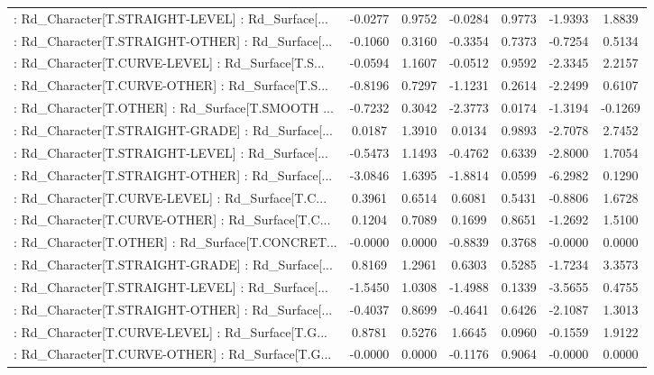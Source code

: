 \begin{longtable}{p{4cm}cccccc}
 : Rd\_Character[T.STRAIGHT-LEVEL] : Rd\_Surface[... & -0.0277 &    0.9752 & -0.0284 &       0.9773 & -1.9393 &  1.8839 \\
 : Rd\_Character[T.STRAIGHT-OTHER] : Rd\_Surface[... & -0.1060 &    0.3160 & -0.3354 &       0.7373 & -0.7254 &  0.5134 \\
 : Rd\_Character[T.CURVE-LEVEL] : Rd\_Surface[T.S... & -0.0594 &    1.1607 & -0.0512 &       0.9592 & -2.3345 &  2.2157 \\
 : Rd\_Character[T.CURVE-OTHER] : Rd\_Surface[T.S... & -0.8196 &    0.7297 & -1.1231 &       0.2614 & -2.2499 &  0.6107 \\
 : Rd\_Character[T.OTHER] : Rd\_Surface[T.SMOOTH ... & -0.7232 &    0.3042 & -2.3773 &       0.0174 & -1.3194 & -0.1269 \\
 : Rd\_Character[T.STRAIGHT-GRADE] : Rd\_Surface[... &  0.0187 &    1.3910 &  0.0134 &       0.9893 & -2.7078 &  2.7452 \\
 : Rd\_Character[T.STRAIGHT-LEVEL] : Rd\_Surface[... & -0.5473 &    1.1493 & -0.4762 &       0.6339 & -2.8000 &  1.7054 \\
 : Rd\_Character[T.STRAIGHT-OTHER] : Rd\_Surface[... & -3.0846 &    1.6395 & -1.8814 &       0.0599 & -6.2982 &  0.1290 \\
 : Rd\_Character[T.CURVE-LEVEL] : Rd\_Surface[T.C... &  0.3961 &    0.6514 &  0.6081 &       0.5431 & -0.8806 &  1.6728 \\
 : Rd\_Character[T.CURVE-OTHER] : Rd\_Surface[T.C... &  0.1204 &    0.7089 &  0.1699 &       0.8651 & -1.2692 &  1.5100 \\
 : Rd\_Character[T.OTHER] : Rd\_Surface[T.CONCRET... & -0.0000 &    0.0000 & -0.8839 &       0.3768 & -0.0000 &  0.0000 \\
 : Rd\_Character[T.STRAIGHT-GRADE] : Rd\_Surface[... &  0.8169 &    1.2961 &  0.6303 &       0.5285 & -1.7234 &  3.3573 \\
 : Rd\_Character[T.STRAIGHT-LEVEL] : Rd\_Surface[... & -1.5450 &    1.0308 & -1.4988 &       0.1339 & -3.5655 &  0.4755 \\
 : Rd\_Character[T.STRAIGHT-OTHER] : Rd\_Surface[... & -0.4037 &    0.8699 & -0.4641 &       0.6426 & -2.1087 &  1.3013 \\
 : Rd\_Character[T.CURVE-LEVEL] : Rd\_Surface[T.G... &  0.8781 &    0.5276 &  1.6645 &       0.0960 & -0.1559 &  1.9122 \\
 : Rd\_Character[T.CURVE-OTHER] : Rd\_Surface[T.G... & -0.0000 &    0.0000 & -0.1176 &       0.9064 & -0.0000 &  0.0000 \\

\end{longtable}
